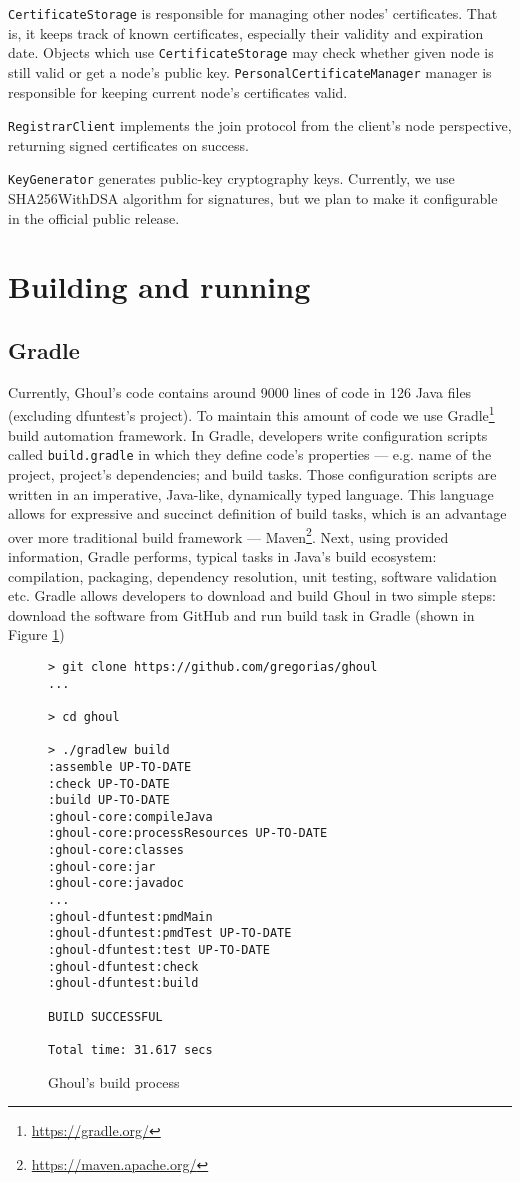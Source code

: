 \texttt{CertificateStorage} is responsible for managing other nodes'
certificates.
That is, it keeps track of known certificates, especially their validity and
expiration date.
Objects which use \texttt{CertificateStorage} may check whether given node
is still valid or get a node's public key.
\texttt{PersonalCertificateManager} manager is responsible for keeping current
node's certificates valid.

\texttt{RegistrarClient} implements the join protocol from the client's node
perspective, returning signed certificates on success.

\texttt{KeyGenerator} generates public-key cryptography keys. 
Currently, we use SHA256WithDSA algorithm for signatures,
but we plan to make it configurable in the official public release.

\section{Building and running}
\label{sec:build}

\subsection{Gradle}
Currently, Ghoul's code contains around 9000 lines of code in 126 Java files
(excluding dfuntest's project).
To maintain this amount of code we use
Gradle\footnote{\url{https://gradle.org/}} build automation framework.
In Gradle, developers write configuration scripts called \texttt{build.gradle}
in which they define code's properties --- e.g. name of the project, project's
dependencies; and build tasks.
Those configuration scripts are written in an imperative, Java-like, dynamically
typed language.
This language allows for expressive and succinct definition of build tasks,
which is an advantage over more traditional build framework ---
Maven\footnote{\url{https://maven.apache.org/}}.
Next, using provided information, Gradle performs, typical tasks in Java's build
ecosystem: compilation, packaging, dependency resolution, unit testing, software
validation etc.
Gradle allows developers to download and build Ghoul in two simple steps:
download the software from GitHub and run build task in Gradle (shown in Figure
\ref{fig:ghoul_build_process})

\begin{figure}[tb]
\begin{verbatim}
> git clone https://github.com/gregorias/ghoul
...

> cd ghoul

> ./gradlew build
:assemble UP-TO-DATE
:check UP-TO-DATE
:build UP-TO-DATE
:ghoul-core:compileJava
:ghoul-core:processResources UP-TO-DATE
:ghoul-core:classes
:ghoul-core:jar
:ghoul-core:javadoc
...
:ghoul-dfuntest:pmdMain
:ghoul-dfuntest:pmdTest UP-TO-DATE
:ghoul-dfuntest:test UP-TO-DATE
:ghoul-dfuntest:check
:ghoul-dfuntest:build

BUILD SUCCESSFUL

Total time: 31.617 secs
\end{verbatim}
\caption{Ghoul's build process}
\label{fig:ghoul_build_process}
\end{figure}

